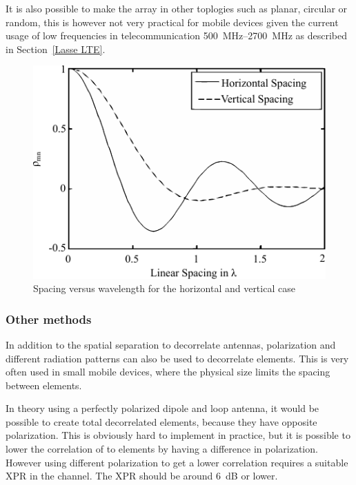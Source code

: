 It is also possible to make the array in other toplogies such as planar, circular or random, this is however not very practical for mobile devices given the current usage of low frequencies in telecommunication \SIrange{500}{2700}{MHz} as described in Section~\ref{Lasse LTE}.

\begin{figure}[htbp]
  \centering
  \includegraphics[scale=1.2]{img/analysis/mimoSpacing}
  \caption{Spacing versus wavelength for the horizontal and vertical case\cite{Tim2012Practical}}
  \label{fig:mimo-spacing}
\end{figure}

\subsubsection{Other methods} %
In addition to the spatial separation to decorrelate antennas, polarization and different radiation patterns can also be used to decorrelate elements. This is very often used in small mobile devices, where the physical size limits the spacing between elements.  

In theory using a perfectly polarized dipole and loop antenna, it would be possible to create total decorrelated elements, because they have opposite polarization. This is obviously hard to implement in practice, but it is possible to lower the correlation of to elements by having a difference in polarization. However using different polarization to get a lower correlation requires a suitable XPR in the channel. The XPR should be around \SI{6}{dB} or lower\cite{Tim2012Practical}. 

